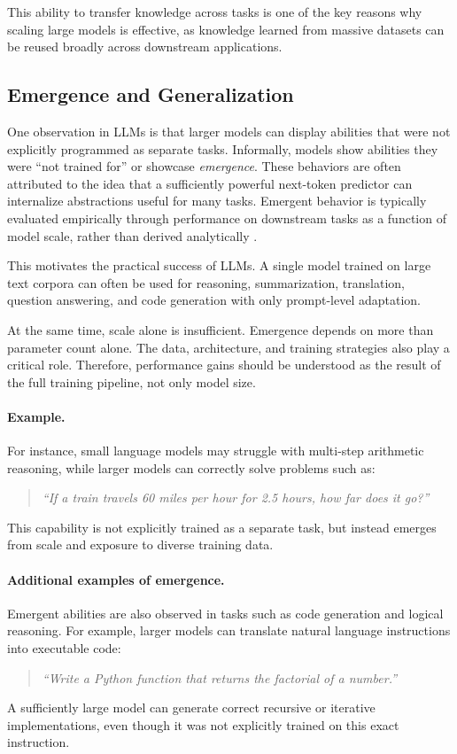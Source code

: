 \documentclass{article}
\begin{document}
This ability to transfer knowledge across tasks is one of the key reasons why scaling large models is effective, as knowledge learned from massive datasets can be reused broadly across downstream applications.

\subsection{Emergence and Generalization}
One observation in LLMs is that larger models can display abilities that were not explicitly programmed as separate tasks. Informally, models show abilities they were ``not trained for'' or showcase \emph{emergence}. These behaviors are often attributed to the idea that a sufficiently powerful next-token predictor can internalize abstractions useful for many tasks. Emergent behavior is typically evaluated empirically through performance on downstream tasks as a function of model scale, rather than derived analytically \cite{wei2022emergent}.

This motivates the practical success of LLMs. A single model trained on large text corpora can often be used for reasoning, summarization, translation, question answering, and code generation with only prompt-level adaptation.

At the same time, scale alone is insufficient. Emergence depends on more than parameter count alone. The data, architecture, and training strategies also play a critical role. Therefore, performance gains should be understood as the result of the full training pipeline, not only model size.

\paragraph{Example.}
For instance, small language models may struggle with multi-step arithmetic reasoning, while larger models can correctly solve problems such as:
\begin{quote}
\textit{“If a train travels 60 miles per hour for 2.5 hours, how far does it go?”}
\end{quote}
This capability is not explicitly trained as a separate task, but instead emerges from scale and exposure to diverse training data.

\paragraph{Additional examples of emergence.}
Emergent abilities are also observed in tasks such as code generation and logical reasoning. For example, larger models can translate natural language instructions into executable code:
\begin{quote}
\textit{“Write a Python function that returns the factorial of a number.”}
\end{quote}
A sufficiently large model can generate correct recursive or iterative implementations, even though it was not explicitly trained on this exact instruction.
\end{document}
